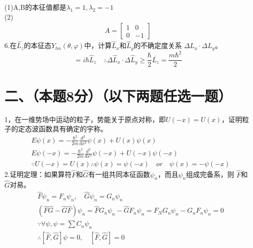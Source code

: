 \documentclass[UTF8]{ctexart}
\begin{document}
(1)A,B的本征值都是$\lambda_1=1,\lambda_2=-1$\\
(2)
\begin{equation*}
  \begin{aligned}
    A=\begin{bmatrix}
      1 & 0  \\
      0 & -1
    \end{bmatrix}
  \end{aligned}
\end{equation*}
6.在$\hat L_z$的本征态$Y_{lm}(\theta,\varphi)$中，计算$\hat L_x$和$\hat L_y$的不确定度关系
$\Delta L_x\cdot\Delta L_y$。
\begin{equation*}
  [\hat L_x,\hat L_y]=i\hbar\hat L_z\quad
  \therefore\Delta\hat L_x\cdot\Delta\hat L_y\geq\frac{\hbar}{2}\overline{L_z}=\frac{m\hbar^2}{2}
\end{equation*}
\section*{二、（本题8分）（以下两题任选一题）}
1，在一维势场中运动的粒子，势能关于原点对称，即$U(-x)=U(x)$，证明粒子的定态波函数具有确定的宇称。\\
\begin{equation*}
  \begin{aligned}
     & E\psi(x)=-\frac{\hbar^2}{2m}\frac{d^2}{dx^2}\psi(x)+U(x)\psi(x)             \\
     & E\psi(-x)=-\frac{\hbar^2}{2m}\frac{d^2}{dx^2}\psi(-x)+U(-x)\psi(-x)         \\
     & \because U(-x)=U(x)\therefore\psi(x)=\psi(-x)\quad or\quad\psi(x)=-\psi(-x)
  \end{aligned}
\end{equation*}
2.证明定理：如果算符$\hat F$和$\hat G$有一组共同本征函数$\psi_n$，而且$\psi_n$组成完备系，则
$\hat F$和$\hat G$对易。
\begin{equation*}
  \begin{aligned}
     & \hat F\psi_n=F_n\psi_n,\quad\hat G\psi_n=G_n\psi_n                \\
     & (\hat F\hat G-\hat G\hat F)\psi_n=\hat FG_n\psi_n-\hat GF_n\psi_n
    =F_NG_n\psi_n-G_nF_n\psi_n=0                                         \\
     & \because\forall\psi,\psi=\sum C_n\psi_n                           \\
     & \therefore[\hat F,\hat G]\psi=0,\quad [\hat F,\hat G]=0
  \end{aligned}
\end{equation*}
\end{document}

